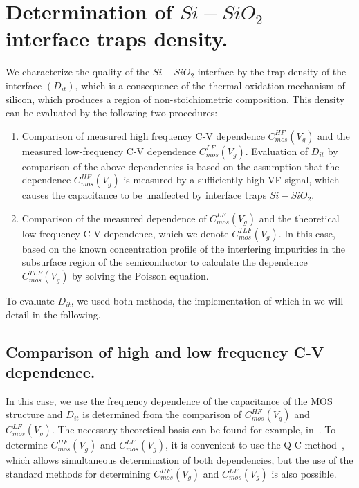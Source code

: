 \section{Determination of $Si-SiO_{2}$ interface traps density.}\label{sec:4.2}

We characterize the quality of the $Si-SiO_{2}$ interface by the trap
density of the interface $(D_{it})$, which is a consequence of the
thermal oxidation mechanism of silicon, which produces a region of
non-stoichiometric composition. This density can be evaluated by the
following two procedures:

\begin{enumerate}
\item Comparison of measured high frequency C-V dependence
  $C_{mos}^{HF}(V_{g})$ and the measured low-frequency C-V dependence
  $C_{mos}^{LF}(V_{g})$. Evaluation of $D_{it}$ by comparison of the
  above dependencies is based on the assumption that the dependence
  $C_{mos}^{HF}(V_{g})$ is measured by a sufficiently high VF signal,
  which causes the capacitance to be unaffected by interface traps
  $Si-SiO_{2}$.
\item Comparison of the measured dependence of $C_{mos}^{LF}(V_{g})$
  and the theoretical low-frequency C-V dependence, which we denote
  $C_{mos}^{TLF}(V_{g})$.  In this case, based on the known
  concentration profile of the interfering impurities in the
  subsurface region of the semiconductor to calculate the dependence
  $C_{mos}^{TLF}(V_{g})$ by solving the Poisson equation.
\end{enumerate}

To evaluate $D_{it}$, we used both methods, the implementation of
which in we will detail in the following.

\subsection{Comparison of high and low frequency C-V dependence.}\label{sec:4.2.1}

In this case, we use the frequency dependence of the capacitance of
the MOS structure and $D_{it}$ is determined from the comparison of
$C_{mos}^{HF}(V_{g})$ and $C_{mos}^{LF}(V_{g})$. The necessary
theoretical basis can be found for example, in~\cite{I.1}.  To
determine $C_{mos}^{HF}(V_{g})$ and $C_{mos}^{LF}(V_{g})$, it is
convenient to use the Q-C method~\cite{3.4, 3.6, 3.7, 3.8}, which
allows simultaneous determination of both dependencies, but the use of
the standard methods for determining $C_{mos}^{HF}(V_{g})$ and
$C_{mos}^{LF}(V_{g})$ is also possible.

